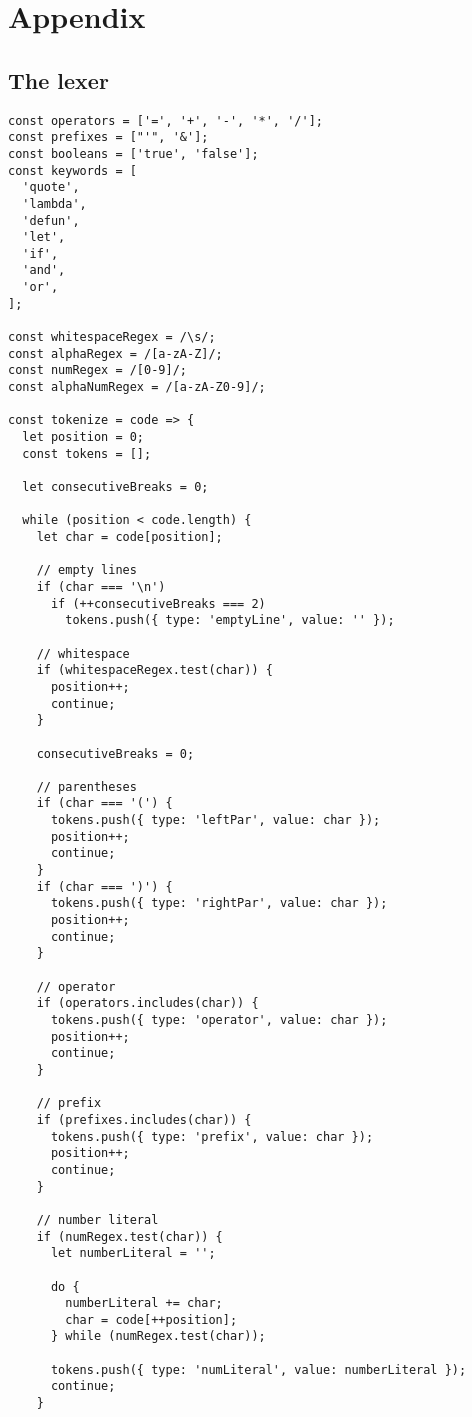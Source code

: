 \chapter*{Appendix}
\section*{The lexer}
\begin{verbatim}
const operators = ['=', '+', '-', '*', '/'];
const prefixes = ["'", '&'];
const booleans = ['true', 'false'];
const keywords = [
  'quote',
  'lambda',
  'defun',
  'let',
  'if',
  'and',
  'or',
];

const whitespaceRegex = /\s/;
const alphaRegex = /[a-zA-Z]/;
const numRegex = /[0-9]/;
const alphaNumRegex = /[a-zA-Z0-9]/;

const tokenize = code => {
  let position = 0;
  const tokens = [];

  let consecutiveBreaks = 0;

  while (position < code.length) {
    let char = code[position];

    // empty lines
    if (char === '\n')
      if (++consecutiveBreaks === 2)
        tokens.push({ type: 'emptyLine', value: '' });

    // whitespace
    if (whitespaceRegex.test(char)) {
      position++;
      continue;
    }

    consecutiveBreaks = 0;

    // parentheses
    if (char === '(') {
      tokens.push({ type: 'leftPar', value: char });
      position++;
      continue;
    }
    if (char === ')') {
      tokens.push({ type: 'rightPar', value: char });
      position++;
      continue;
    }

    // operator
    if (operators.includes(char)) {
      tokens.push({ type: 'operator', value: char });
      position++;
      continue;
    }

    // prefix
    if (prefixes.includes(char)) {
      tokens.push({ type: 'prefix', value: char });
      position++;
      continue;
    }

    // number literal
    if (numRegex.test(char)) {
      let numberLiteral = '';

      do {
        numberLiteral += char;
        char = code[++position];
      } while (numRegex.test(char));

      tokens.push({ type: 'numLiteral', value: numberLiteral });
      continue;
    }


\end{verbatim}
